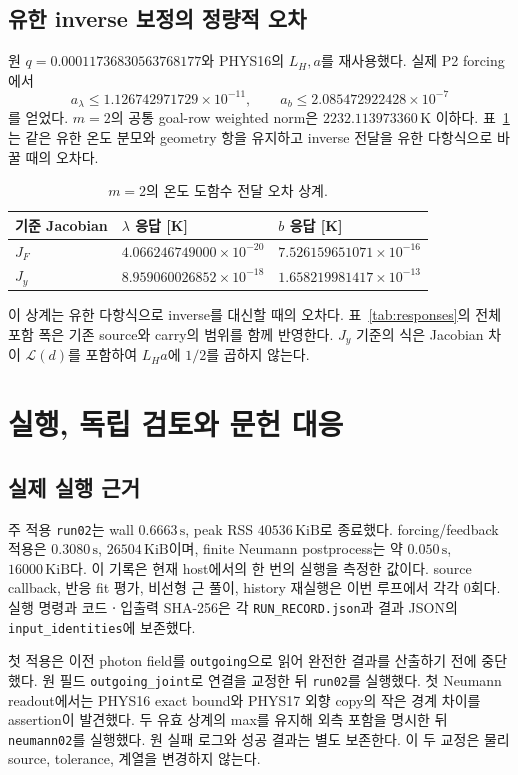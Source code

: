 \subsection{유한 inverse 보정의 정량적 오차}
원 $q=0.00011736830563768177$와 PHYS16의 $L_H,a$를 재사용했다. 실제 P2 forcing에서
\[
a_\lambda\le1.126742971729\times10^{-11},\qquad
a_b\le2.085472922428\times10^{-7}
\]
를 얻었다. $m=2$의 공통 goal-row weighted norm은 $2232.113973360\,\mathrm K$ 이하다. 표~\ref{tab:neumann}는 같은 유한 온도 분모와 geometry 항을 유지하고 inverse 전달을 유한 다항식으로 바꿀 때의 오차다.\cite{neumann17}

\begin{table}[htbp]\centering\small
\caption{$m=2$의 온도 도함수 전달 오차 상계.}\label{tab:neumann}
\begin{tabular}{lll}\toprule
기준 Jacobian & $\lambda$ 응답 [K] & $b$ 응답 [K]\\\midrule
$J_F$ & $4.066246749000\times10^{-20}$ & $7.526159651071\times10^{-16}$\\
$J_y$ & $8.959060026852\times10^{-18}$ & $1.658219981417\times10^{-13}$\\
\bottomrule\end{tabular}
\end{table}
이 상계는 유한 다항식으로 inverse를 대신할 때의 오차다. 표~\ref{tab:responses}의 전체 포함 폭은 기존 source와 carry의 범위를 함께 반영한다. $J_y$ 기준의 식은 Jacobian 차이 $\mathcal L(d)$를 포함하여 $L_Ha$에 $1/2$를 곱하지 않는다.

\section{실행, 독립 검토와 문헌 대응}
\label{sec:evidence}
\subsection{실제 실행 근거}
주 적용 \texttt{run02}는 wall $0.6663\,\mathrm s$, peak RSS $40536\,\mathrm{KiB}$로 종료했다. forcing/feedback 적용은 $0.3080\,\mathrm s$, $26504\,\mathrm{KiB}$이며, finite Neumann postprocess는 약 $0.050\,\mathrm s$, $16000\,\mathrm{KiB}$다. 이 기록은 현재 host에서의 한 번의 실행을 측정한 값이다. source callback, 반응 fit 평가, 비선형 근 풀이, history 재실행은 이번 루프에서 각각 0회다. 실행 명령과 코드ㆍ입출력 SHA-256은 각 \texttt{RUN\_RECORD.json}과 결과 JSON의 \texttt{input\_identities}에 보존했다.\cite{app17,forcing17,neumann17}

첫 적용은 이전 photon field를 \texttt{outgoing}으로 읽어 완전한 결과를 산출하기 전에 중단했다. 원 필드 \texttt{outgoing\_joint}로 연결을 교정한 뒤 \texttt{run02}를 실행했다. 첫 Neumann readout에서는 PHYS16 exact bound와 PHYS17 외향 copy의 작은 경계 차이를 assertion이 발견했다. 두 유효 상계의 max를 유지해 외측 포함을 명시한 뒤 \texttt{neumann02}를 실행했다. 원 실패 로그와 성공 결과는 별도 보존한다. 이 두 교정은 물리 source, tolerance, 계열을 변경하지 않는다.

